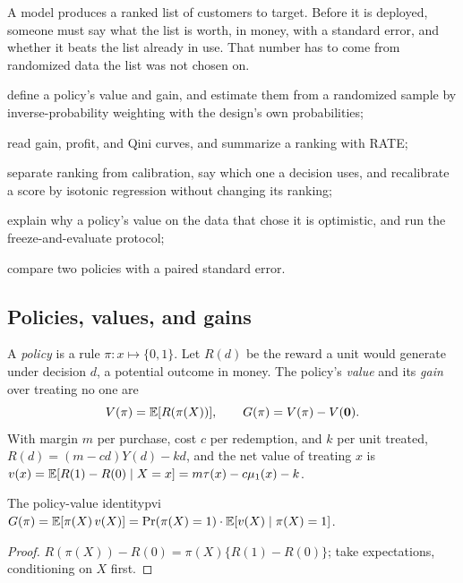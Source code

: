 \documentclass[11pt]{article}
\begin{document}

\begin{decision}
A model produces a ranked list of customers to target. Before it is deployed, someone must say what the list is
worth, in money, with a standard error, and whether it beats the list already in use. That number has to
come from randomized data the list was not chosen on.
\end{decision}

\begin{goals}
  \item define a policy's value and gain, and estimate them from a randomized sample by inverse-probability
  weighting with the design's own probabilities;
  \item read gain, profit, and Qini curves, and summarize a ranking with RATE;
  \item separate ranking from calibration, say which one a decision uses, and recalibrate a score by isotonic
  regression without changing its ranking;
  \item explain why a policy's value on the data that chose it is optimistic, and run the freeze-and-evaluate
  protocol;
  \item compare two policies with a paired standard error.
\end{goals}

\sectionone

\subsection{Policies, values, and gains}

A \emph{policy} is a rule $\pi: x \mapsto \{0,1\}$. Let $R(d)$ be the reward a unit would generate under decision $d$, a
potential outcome in money. The policy's \emph{value} and its \emph{gain} over treating no one are
\[
  V(\pi) = \mathbb{E}[R(\pi(X))], \qquad G(\pi) = V(\pi) - V(\mathbf{0}) .
\]
With margin $m$ per purchase, cost $c$ per redemption, and $k$ per unit treated, $R(d) = (m - cd)Y(d) - kd$, and
the net value of treating $x$ is $v(x) = \mathbb{E}[R(1) - R(0) \mid X = x] = m\tau(x) - c\mu_1(x) - k$.

\begin{prop}{The policy-value identity}{pvi}
$G(\pi) = \mathbb{E}[\pi(X)\,v(X)] = \Pr(\pi(X) = 1)\cdot\mathbb{E}[v(X) \mid \pi(X) = 1]$.
\end{prop}
\begin{proof}
$R(\pi(X)) - R(0) = \pi(X)\{R(1) - R(0)\}$; take expectations, conditioning on $X$ first.
\end{proof}
\end{document}
